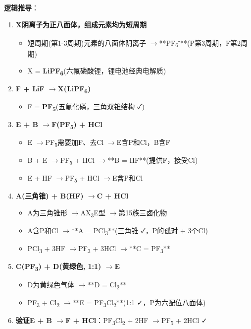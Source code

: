 \documentclass[a4paper,11pt]{ctexart}
\providecommand{\tightlist}{\setlength{\itemsep}{0pt}\setlength{\parskip}{0pt}}
\newcommand{\箭}{\ensuremath{\rightarrow}}
\newcommand{\左箭}{\ensuremath{\leftarrow}}
\newcommand{\上箭}{\ensuremath{\uparrow}}
\newcommand{\下箭}{\ensuremath{\downarrow}}
\newcommand{\衡}{\ensuremath{\rightleftharpoons}}
\newcommand{\双箭}{\ensuremath{\leftrightarrow}}
\newcommand{\约等于}{\ensuremath{\approx}}
\newcommand{\小于等于}{\ensuremath{\leq}}
\newcommand{\大于等于}{\ensuremath{\geq}}
\newcommand{\不等于}{\ensuremath{\neq}}
\newcommand{\西格马}{\ensuremath{\sigma}}
\newcommand{\派}{\ensuremath{\pi}}
\begin{document}
\textbf{逻辑推导}：

\begin{enumerate}
\def\labelenumi{\arabic{enumi}.}
\tightlist
\item
  \textbf{X阴离子为正八面体，组成元素均为短周期}

  \begin{itemize}
  \tightlist
  \item
    短周期(第1-3周期)元素的八面体阴离子 \箭 **PF\textsubscript{6}\textsuperscript{-}**(P第3周期，F第2周期)
  \item
    X = \textbf{LiPF\textsubscript{6}}(六氟磷酸锂，锂电池经典电解质)
  \end{itemize}
\item
  \textbf{F + LiF \箭 X(LiPF\textsubscript{6})}

  \begin{itemize}
  \tightlist
  \item
    F = \textbf{PF\textsubscript{5}}(五氟化磷，三角双锥结构 ✓)
  \end{itemize}
\item
  \textbf{E + B \箭 F(PF\textsubscript{5}) + HCl}

  \begin{itemize}
  \tightlist
  \item
    E \箭 PF\textsubscript{5}需要加F、去Cl \箭 E含P和Cl，B含F
  \item
    B + E \箭 PF\textsubscript{5} + HCl \箭 **B = HF**(提供F，接受Cl)
  \item
    E + HF \箭 PF\textsubscript{5} + HCl \箭 E含P和Cl
  \end{itemize}
\item
  \textbf{A(三角锥) + B(HF) \箭 C + HCl}

  \begin{itemize}
  \tightlist
  \item
    A为三角锥形 \箭 AX\textsubscript{3}E型 \箭 第15族三卤化物
  \item
    A含P和Cl \箭 **A = PCl\textsubscript{3}**(三角锥 ✓，P的孤对 + 3个Cl)
  \item
    PCl\textsubscript{3} + 3HF \箭 PF\textsubscript{3} + 3HCl \箭 **C = PF\textsubscript{3}**
  \end{itemize}
\item
  \textbf{C(PF\textsubscript{3}) + D(黄绿色, 1:1) \箭 E}

  \begin{itemize}
  \tightlist
  \item
    D为黄绿色气体 \箭 **D = Cl\textsubscript{2}**
  \item
    PF\textsubscript{3} + Cl\textsubscript{2} \箭 **E = PF\textsubscript{3}Cl\textsubscript{2}**(1:1 ✓，P为六配位八面体)
  \end{itemize}
\item
  \textbf{验证E + B \箭 F + HCl}：PF\textsubscript{3}Cl\textsubscript{2} + 2HF \箭 PF\textsubscript{5} + 2HCl ✓
\end{enumerate}
\end{document}

